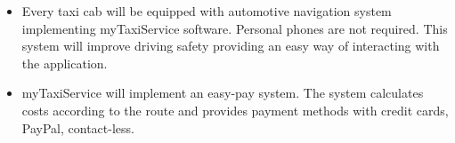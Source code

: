 \begin{itemize}
	\item Every taxi cab will be equipped with automotive navigation system implementing myTaxiService software. Personal phones are not required. This system will improve driving safety providing an easy way of interacting with the application.
	\item myTaxiService will implement an easy-pay system. The system calculates costs according to the route and provides payment methods with credit cards, PayPal, contact-less.
\end{itemize}